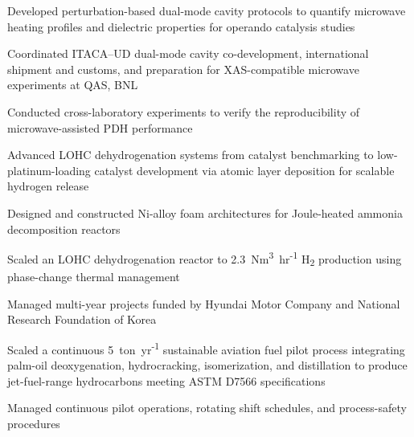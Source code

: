 \begin{cvbullets}
  \item Developed perturbation-based dual-mode cavity protocols to quantify microwave heating
        profiles and dielectric properties for operando catalysis studies
  \item Coordinated ITACA--UD dual-mode cavity co-development, international shipment and
        customs, and preparation for XAS-compatible microwave experiments at QAS, BNL
\end{cvbullets}

\begin{cvbullets}
  \item Conducted cross-laboratory experiments to verify the reproducibility of
        microwave-assisted PDH performance
\end{cvbullets}

\begin{cvbullets}
  \item Advanced LOHC dehydrogenation systems from catalyst benchmarking to
        low-platinum-loading catalyst development via atomic layer deposition for scalable
        hydrogen release
  \item Designed and constructed Ni-alloy foam architectures for Joule-heated ammonia
        decomposition reactors
  \item Scaled an LOHC dehydrogenation reactor to 2.3~Nm\textsuperscript{3}~hr\textsuperscript{-1}
        H\textsubscript{2} production using phase-change thermal management
  \item Managed multi-year projects funded by Hyundai Motor Company and National Research
        Foundation of Korea
\end{cvbullets}

\begin{cvbullets}
  \item Scaled a continuous 5~ton~yr\textsuperscript{-1} sustainable aviation fuel pilot
        process integrating palm-oil deoxygenation, hydrocracking, isomerization, and
        distillation to produce jet-fuel-range hydrocarbons meeting ASTM D7566 specifications
  \item Managed continuous pilot operations, rotating shift schedules, and process-safety
        procedures
\end{cvbullets}


